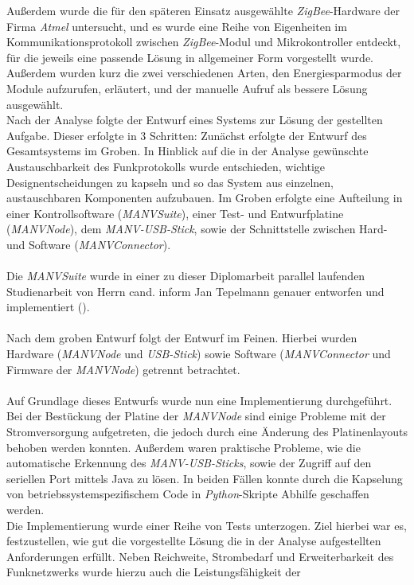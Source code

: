 Außerdem wurde die für den späteren Einsatz ausgewählte \emph{ZigBee}-Hardware 
der Firma \emph{Atmel} untersucht, und es wurde eine Reihe von Eigenheiten im Kommunikationsprotokoll 
zwischen \emph{ZigBee}-Modul und Mikrokontroller entdeckt, für die jeweils eine passende Lösung in 
allgemeiner Form vorgestellt wurde.  Außerdem wurden kurz die zwei verschiedenen Arten, 
den Energiesparmodus der Module aufzurufen, erläutert, und der manuelle Aufruf als bessere Lösung ausgewählt.\\
Nach der Analyse folgte der Entwurf eines Systems zur Lösung der gestellten Aufgabe. Dieser erfolgte in 3 
Schritten: Zunächst erfolgte der Entwurf des Gesamtsystems im Groben. In Hinblick auf die in der Analyse
gewünschte Austauschbarkeit des Funkprotokolls wurde entschieden, wichtige Designentscheidungen zu kapseln und
so das System aus einzelnen, austauschbaren Komponenten aufzubauen. Im Groben erfolgte eine Aufteilung in 
einer Kontrollsoftware (\emph{MANVSuite}), einer Test- und Entwurfplatine (\emph{MANVNode}), 
dem \emph{MANV-USB-Stick}, sowie der Schnittstelle zwischen Hard- und Software (\emph{MANVConnector}).\\
\\
Die \emph{MANVSuite} wurde in einer zu dieser Diplomarbeit parallel laufenden Studienarbeit von 
Herrn cand. inform Jan Tepelmann genauer entworfen und implementiert (\cite{Jan}).\\
\\
Nach dem groben Entwurf folgt der Entwurf im Feinen. Hierbei wurden Hardware (\emph{MANVNode} und \emph{USB-Stick})
sowie Software (\emph{MANVConnector} und Firmware der \emph{MANVNode}) getrennt betrachtet.\\
\\
Auf Grundlage dieses Entwurfs wurde nun eine Implementierung durchgeführt. 
Bei der Bestückung der Platine der \emph{MANVNode} sind einige Probleme mit der Stromversorgung aufgetreten,
die jedoch durch eine Änderung des Platinenlayouts behoben werden konnten. Außerdem waren praktische
Probleme, wie die automatische Erkennung des \emph{MANV-USB-Sticks}, sowie der Zugriff auf den seriellen Port
mittels Java zu lösen. In beiden Fällen konnte durch die Kapselung von betriebssystemspezifischem Code in
\emph{Python}-Skripte Abhilfe geschaffen werden. \\
Die Implementierung wurde einer Reihe von Tests unterzogen. Ziel hierbei war es,
festzustellen, wie gut die vorgestellte Lösung die in der Analyse aufgestellten Anforderungen erfüllt. Neben
Reichweite, Strombedarf und Erweiterbarkeit des Funknetzwerks wurde hierzu auch die Leistungsfähigkeit der 
